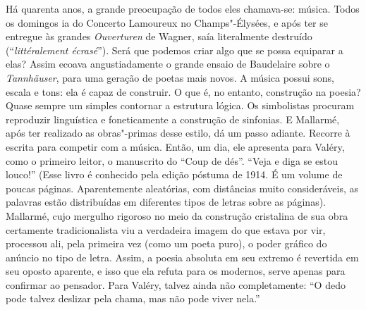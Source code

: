 Há quarenta anos, a grande preocupação de todos eles chamava-se: música.
Todos os domingos ia do Concerto Lamoureux no Champs"-Élysées, e após ter se entregue às %
grandes \emph{Ouverturen} de Wagner, saía literalmente destruído (``\emph{littéralement %
écrasé}''). Será que podemos criar algo que se possa equiparar
a elas? Assim ecoava angustiadamente o grande ensaio de Baudelaire
sobre o \emph{Tannhäuser}, para uma geração de poetas mais novos. A música possui
sons, escala e tons: ela é capaz de construir. O que é, no entanto,
construção na poesia? Quase sempre um simples contornar a estrutura
lógica. Os simbolistas procuram reproduzir linguística e foneticamente a
construção de sinfonias. E Mallarmé, após ter realizado as obras"-primas
desse estilo, dá um passo adiante. Recorre à
escrita para competir com a música. Então, um dia, ele apresenta para
Valéry, como o primeiro leitor, o manuscrito do ``Coup de dés''. ``Veja
e diga se estou louco!'' (Esse livro é conhecido pela edição póstuma de
1914. É um volume de poucas páginas. Aparentemente aleatórias,
com distâncias muito consideráveis, as palavras estão distribuídas em
diferentes tipos de letras sobre as páginas). Mallarmé, cujo mergulho
rigoroso no meio da construção cristalina de sua obra certamente
tradicionalista viu a verdadeira imagem do que estava por vir, processou
ali, pela primeira vez (como um poeta puro), o poder gráfico do anúncio
no tipo de letra. Assim, a poesia absoluta em seu extremo é revertida em seu oposto
aparente, e isso que ela refuta para os modernos, serve apenas para confirmar ao pensador. Para Valéry, talvez ainda não completamente: ``O dedo
pode talvez deslizar pela chama, mas não pode viver nela.''
